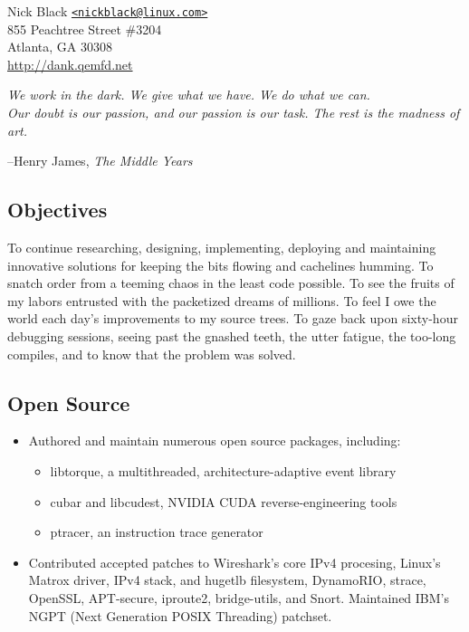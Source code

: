 \documentclass{article}
\newenvironment{tightitemize}
{\begin{itemize}
  \setlength{\itemsep}{1pt}
  \setlength{\parskip}{0pt}
  \setlength{\parsep}{0pt}}
{\end{itemize}}
\begin{document}
{\noindent}\small Nick Black \href{mailto:nickblack@linux.com}{\nolinkurl{<nickblack@linux.com>}}\\
\scriptsize{855 Peachtree Street \#3204\\
Atlanta, GA 30308}\\
\href{http://dank.qemfd.net}{http://dank.qemfd.net}\\

{\noindent}\tiny{
\textit{We work in the dark. We give what we have. We do what we can.\\
Our doubt is our passion, and our passion is our task. The rest is the madness of art.}

--Henry James, \textit{The Middle Years}}

\footnotesize

\subsection*{Objectives}
To continue researching, designing, implementing, deploying and maintaining
innovative solutions for keeping the bits flowing and cachelines humming.
To snatch order from a teeming chaos in the least code possible. To see the
fruits of my labors entrusted with the packetized dreams of millions. To feel I
owe the world each day's improvements to my source trees. To gaze back upon
sixty-hour debugging sessions, seeing past the gnashed teeth, the utter
fatigue, the too-long compiles, and to know that the problem was solved.

\subsection*{Open Source}
\begin{tightitemize}
\item Authored and maintain numerous open source packages, including:
\begin{tightitemize}
\item libtorque, a multithreaded, architecture-adaptive event library
\item cubar and libcudest, NVIDIA CUDA reverse-engineering tools
\item ptracer, an instruction trace generator
\end{tightitemize}
\item Contributed accepted patches to Wireshark's core IPv4 procesing, Linux's
  Matrox driver, IPv4 stack, and hugetlb filesystem, DynamoRIO,
  strace, OpenSSL, APT-secure, iproute2, bridge-utils, and Snort.
  Maintained IBM's NGPT (Next Generation POSIX Threading) patchset.
\end{tightitemize}
\end{document}
